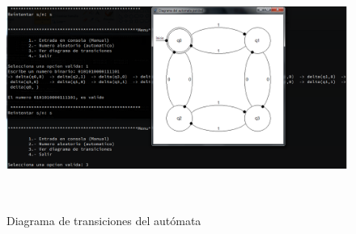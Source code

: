 	\begin{figure}[H]
		\begin{center}
			\includegraphics[width=\linewidth, height=8cm]{img/diagrama-paridad.png}
			\caption{Diagrama de transiciones del autómata}
			\label{fig:paridad3}
		\end{center}
	\end{figure}
